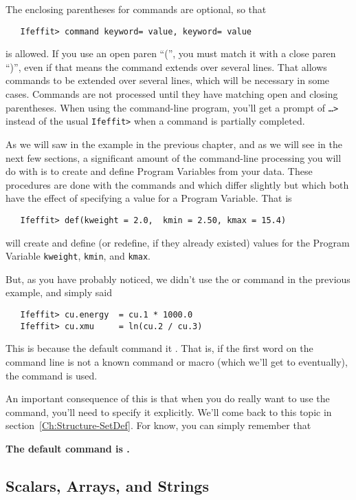 The enclosing parentheses for commands are optional, so that
\begin{verbatim}
   Ifeffit> command keyword= value, keyword= value
\end{verbatim}
\noindent
is allowed.  If you use an open paren ``('', you must match it with a close
paren ``)'', even if that means the command extends over several lines.
That allows commands to be extended over several lines, which will be
necessary in some cases.  Commands are not processed until they have
matching open and closing parentheses.  When using the command-line
program, you'll get a prompt of {\tt{\ldots>}} instead of the usual
{\tt{Ifeffit>}} when a command is partially completed.  

As we will saw in the example in the previous chapter, and as we will see
in the next few sections, a significant amount of the command-line
processing you will do with {\ifeffit} is to create and define Program
Variables from your data.  These procedures are done with the commands
{} and {} which differ slightly but which both have the
effect of specifying a value for a Program Variable. That is
\begin{verbatim}
   Ifeffit> def(kweight = 2.0,  kmin = 2.50, kmax = 15.4)
\end{verbatim}
\noindent
will create and define (or redefine, if they already existed) values for
the Program Variable {\tt{kweight}}, {\tt{kmin}}, and {\tt{kmax}}.

But, as you have probably noticed, we didn't use the {} or
{} command in the previous example, and simply said
\begin{verbatim}
   Ifeffit> cu.energy  = cu.1 * 1000.0
   Ifeffit> cu.xmu     = ln(cu.2 / cu.3)
\end{verbatim}
\noindent
This is because the default command it {}.  That is, if the first
word on the command line is not a known command or macro (which we'll get
to eventually), the {} command is used.

An important consequence of this is that when you do really want to use the
{} command, you'll need to specify it explicitly.  We'll come
back to this topic in section~\ref{Ch:Structure-SetDef}.  For know, you can
simply remember that 
\begin{center}
   {\bf{\large{The default command is {}.}}}
\end{center}


\subsection{Scalars, Arrays, and Strings} \label{Ch:Structure-variables} 

